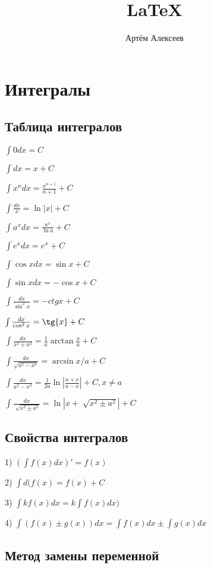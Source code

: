 \documentclass[12pt,a4paper]{article}
\title{\LaTeX}
\date{}
\author{Артём Алексеев}
\begin{document}
\section{Интегралы}
\subsection{Таблица интегралов}

\begin{minipage}{0.4\textwidth}
\begin{flushleft}
$ \int{0dx} = C $ 

$ \int{dx} = x + C $ 

$ \int{x^n dx} = \frac{x^{n+1}}{n+1} + C $ 

$ \int{\frac{dx}{x}} = \ln{|x|} + C $ 

$ \int{a^x dx} = \frac{a^x}{\ln{a}} + C $ 

$ \int{e^x dx} = e^x + C $ 

$ \int{\cos{x}dx} = \sin{x} + C $ 

$ \int{\sin{x}dx} = -\cos{x} + C $
\end{flushleft}
\end{minipage}
\hfill
\begin{minipage}{0.5\textwidth}
\begin{flushleft}
$ \int{\frac{dx}{\sin^2{x}}} = -ctg{x} + C $ 

$ \int{\frac{dx}{\cos^2{x}}} = \tg{x} + C $ 

$ \int{\frac{dx}{x^2+a^2}} = \frac{1}{a} \arctan \frac{x}{a} + C $ 

$ \int{\frac{dx}{\sqrt{a^2-x^2}}} = \arcsin{x/a} + C $ 

$ \int{\frac{dx}{a^2-x^2}}=\frac{1}{2a}\ln{|\frac{a+x}{a-x}|} + C, x \neq a $ 

$ \int{\frac{dx}{\sqrt[]{x^2 \pm a^2}}} = \ln{|x + \sqrt[]{x^2 \pm a^2}|} + C $
\end{flushleft}
\end{minipage}

\subsection{Свойства интегралов}
1) $ (\int{f(x)dx})' = f(x) $ 

2) $ \int{d(f(x)} = f(x) + C $ 

3) $ \int{k f(x)dx} = k \int{f(x)dx)} $ 

4) $ \int{(f(x) \pm g(x))dx} = \int{f(x)dx} \pm \int{g(x)dx}$

\subsection{Метод замены переменной}
\end{document}
